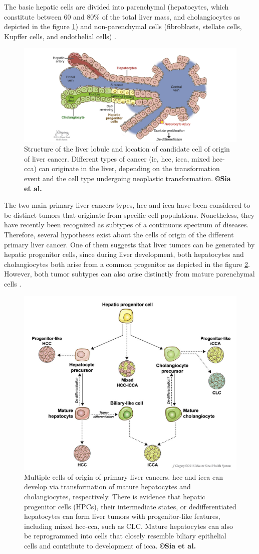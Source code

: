 The basic hepatic cells are divided into parenchymal (hepatocytes, which
constitute between 60 and 80\% of the total liver mass, and
cholangiocytes as depicted in the figure \ref{Sia2017_Fig2}) and non-parenchymal
cells (fibroblasts, stellate cells, Kupffer cells, and endothelial
cells) \cite{Sia2017}.

\begin{figure}[th!]
\centering
\includegraphics[width=0.7\linewidth]{images/image8}
\caption{Structure of the liver lobule and location of candidate cell of origin of liver cancer. Different types of cancer (ie, \ac{hcc}, \ac{icca}, mixed \ac{hcc-cca}) can originate in the liver, depending on the transformation event and the cell type undergoing neoplastic transformation. \textbf{©Sia et al.} \cite{Sia2017}}
\label{Sia2017_Fig2}
\end{figure}
The two main primary liver cancers types, \ac{hcc} and \ac{icca}
have been considered to be distinct tumors that originate from specific
cell populations. Nonetheless, they have recently been recognized as
subtypes of a continuous spectrum of diseases. Therefore, several
hypotheses exist about the cells of origin of the different primary
liver cancer.
One of them suggests that liver tumors can be generated by hepatic
progenitor cells, since during liver development, both hepatocytes and
cholangiocytes both arise from a common progenitor as depicted in the figure \ref{Sia2017_Fig3}.
However, both tumor subtypes can also arise distinctly from mature
parenchymal cells \cite{Sia2017}.
\begin{figure}[th!]
\centering
\includegraphics[width=0.5\linewidth]{images/image13}
\caption{Multiple cells of origin of primary liver cancers. \ac{hcc} and \ac{icca} can develop via transformation of mature hepatocytes and cholangiocytes, respectively. There is evidence that hepatic progenitor cells (HPCs), their intermediate states, or dedifferentiated hepatocytes can form liver tumors with progenitor-like features, including mixed \ac{hcc-cca}, such as CLC. Mature hepatocytes can also be reprogrammed into cells that closely resemble biliary epithelial cells and contribute to development of \ac{icca}. \textbf{©Sia et al.} \cite{Sia2017}}
\label{Sia2017_Fig3}
\end{figure}\\
